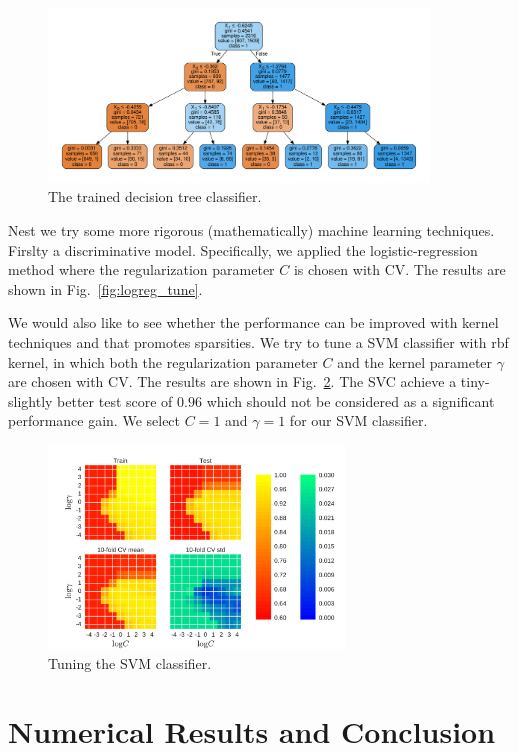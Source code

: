 \documentclass{article}
\begin{document}
\begin{figure}[h]
  \centering
  \includegraphics[width=0.9\textwidth]{figs/tree_structure.pdf}
  \caption{The trained decision tree classifier.}
  \label{fig:tree_structure}
\end{figure}

Nest we try some more rigorous (mathematically) machine learning techniques.
Firslty a discriminative model. Specifically, we applied the
logistic-regression method where the regularization parameter $C$ is chosen with
CV. The results are shown in Fig.~\ref{fig:logreg_tune}. 

We would also like to see whether the performance can be improved with kernel
techniques and that promotes sparsities. We try to tune a SVM classifier with rbf kernel,
in which both the regularization parameter $C$ and the kernel parameter $\gamma$
are chosen with CV. The results are shown in Fig.~\ref{fig:svc_tune}. The SVC
achieve a tiny-slightly better test score of $0.96$ which should not be
considered as a significant performance gain. We select $C=1$ and $\gamma=1$ for
our SVM classifier.

\begin{figure}[h]
  \centering
  \includegraphics[width=0.7\textwidth]{figs/svc_tuning.pdf}
  \caption{Tuning the SVM classifier.}
  \label{fig:svc_tune}
\end{figure}




\section{Numerical Results and Conclusion}




%
%



\end{document}
